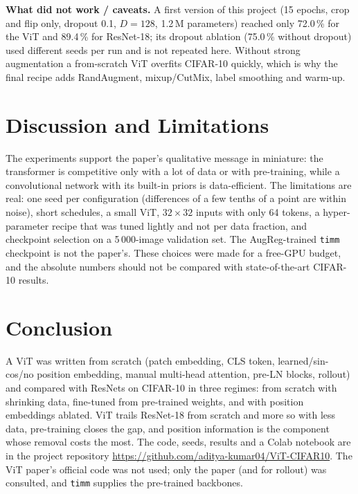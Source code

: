 \documentclass[conference]{IEEEtran}
\newif\ifdraft \drafttrue
\newcommand{\verify}[1]{\ifdraft{\color{red}#1}\else#1\fi}
\begin{document}
\textbf{What did not work / caveats.} A first version of this project (15 epochs, crop and flip only, dropout 0.1, $D{=}128$, 1.2\,M parameters) reached only 72.0\,\% for the ViT and 89.4\,\% for ResNet-18; its dropout ablation (75.0\,\% without dropout) used different seeds per run and is not repeated here. Without strong augmentation a from-scratch ViT overfits CIFAR-10 quickly, which is why the final recipe adds RandAugment, mixup/CutMix, label smoothing and warm-up.

\section{Discussion and Limitations}
\verify{The experiments support the paper's qualitative message in miniature: the transformer is competitive only with a lot of data or with pre-training, while a convolutional network with its built-in priors is data-efficient.} The limitations are real: \verify{one seed per configuration (differences of a few tenths of a point are within noise)}, short schedules, a small ViT, $32\times32$ inputs with only 64 tokens, a hyper-parameter recipe that was tuned lightly and not per data fraction, and checkpoint selection on a 5\,000-image validation set. The AugReg-trained \texttt{timm} checkpoint is not the paper's. These choices were made for a free-GPU budget, and the absolute numbers should not be compared with state-of-the-art CIFAR-10 results.

\section{Conclusion}
A ViT was written from scratch (patch embedding, CLS token, learned/sin-cos/no position embedding, manual multi-head attention, pre-LN blocks, rollout) and compared with ResNets on CIFAR-10 in three regimes: from scratch with shrinking data, fine-tuned from pre-trained weights, and with position embeddings ablated. \verify{ViT trails ResNet-18 from scratch and more so with less data, pre-training closes the gap, and position information is the component whose removal costs the most.} The code, seeds, results and a Colab notebook are in the project repository \url{https://github.com/aditya-kumar04/ViT-CIFAR10}. The ViT paper's official code was not used; only the paper (and \cite{abnar2020} for rollout) was consulted, and \texttt{timm} supplies the pre-trained backbones.
\end{document}
